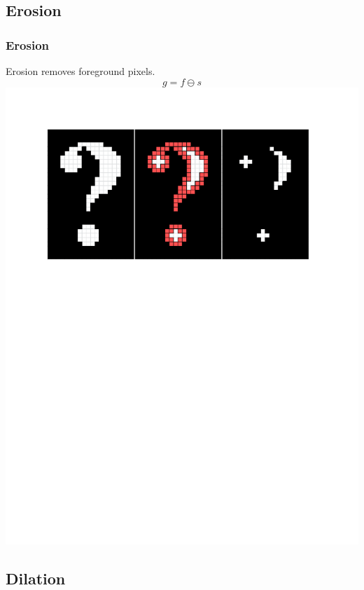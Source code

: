 \documentclass{beamer}
\begin{document}
\subsection[Erosion]{Erosion}

\begin{frame}
\frametitle{Erosion}
\begin{center}
Erosion removes foreground pixels.
\begin{equation*}
g = f \ominus s
\end{equation*}
\includegraphics[width=1\textwidth,trim={0 0 0 0.5in},clip]{erosion}
\end{center}
\end{frame}

\subsection[Dilation]{Dilation}
\end{document}
